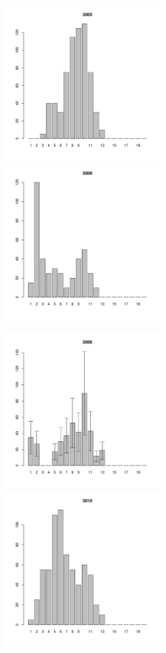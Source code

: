 \documentclass[12pt, a4paper]{article}
\begin{document}
\begin{figure}[h]
\begin{multicols}{3}
\hfill
\includegraphics[width=60mm]{../White_Sea/Luvenga_Goreliy/midlow_2005_.pdf}
\hfill
\includegraphics[width=60mm]{../White_Sea/Luvenga_Goreliy/midlow_2009_.pdf}
\end{multicols}


\begin{multicols}{3}
\hfill
\includegraphics[width=60mm]{../White_Sea/Luvenga_Goreliy/midlow_2006_.pdf}
\hfill
\includegraphics[width=60mm]{../White_Sea/Luvenga_Goreliy/midlow_2010_.pdf}
\end{multicols}


\end{figure}
\end{document}
